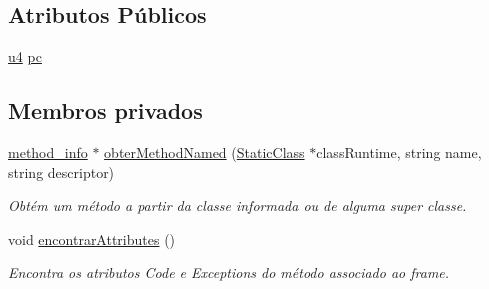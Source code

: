 \subsection*{Atributos Públicos}
\begin{DoxyCompactItemize}
\item 
\hyperlink{BasicTypes_8h_ae5be1f726785414dd1b77d60df074c9d}{u4} \hyperlink{classFrame_ada6a6cf76d00cbadf43a86a686dd026c}{pc}
\end{DoxyCompactItemize}
\subsection*{Membros privados}
\begin{DoxyCompactItemize}
\item 
\hyperlink{structmethod__info}{method\+\_\+info} $\ast$ \hyperlink{classFrame_a9920bdecf44e07796b7feea5bc4f1a6c}{obter\+Method\+Named} (\hyperlink{classStaticClass}{Static\+Class} $\ast$class\+Runtime, string name, string descriptor)
\begin{DoxyCompactList}\small\item\em Obtém um método a partir da classe informada ou de alguma super classe. \end{DoxyCompactList}\item 
void \hyperlink{classFrame_a6950091ee708f622befdfcc7c35b7025}{encontrar\+Attributes} ()
\begin{DoxyCompactList}\small\item\em Encontra os atributos Code e Exceptions do método associado ao frame. \end{DoxyCompactList}\end{DoxyCompactItemize}
